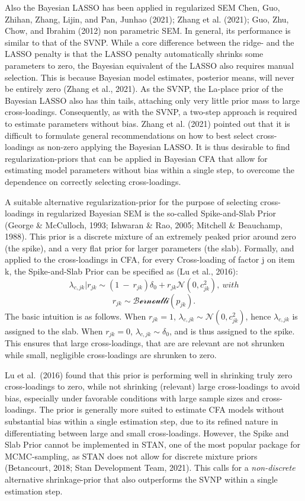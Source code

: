 \documentclass[
  man, donotrepeattitle,floatsintext]{apa6}
\begin{document}
Also the Bayesian LASSO has been applied in regularized SEM Chen, Guo, Zhihan, Zhang, Lijin, and Pan, Junhao (2021); Zhang et al. (2021); Guo, Zhu, Chow, and Ibrahim (2012) non parametric SEM. In general, its performance is similar to that of the SVNP. While a core difference between the ridge- and the LASSO penalty is that the LASSO penalty automatically shrinks some parameters to zero, the Bayesian equivalent of the LASSO also requires manual selection. This is because Bayesian model estimates, posterior means, will never be entirely zero (Zhang et al., 2021). As the SVNP, the La-place prior of the Bayesian LASSO also has thin tails, attaching only very little prior mass to large cross-loadings. Consequently, as with the SVNP, a two-step approach is required to estimate parameters without bias. Zhang et al. (2021) pointed out that it is difficult to formulate general recommendations on how to best select cross-loadings as non-zero applying the Bayesian LASSO. It is thus desirable to find regularization-priors that can be applied in Bayesian CFA that allow for estimating model parameters without bias within a single step, to overcome the dependence on correctly selecting cross-loadings.

A suitable alternative regularization-prior for the purpose of selecting cross-loadings in
regularized Bayesian SEM is the so-called Spike-and-Slab Prior (George \& McCulloch, 1993; Ishwaran \& Rao, 2005; Mitchell \& Beauchamp, 1988). This prior is a discrete mixture of an extremely peaked prior around zero (the spike), and a very flat prior for larger parameters (the slab). Formally, and applied to the cross-loadings in CFA, for every Cross-loading of factor j
on item k, the Spike-and-Slab Prior can be specified as (Lu et al., 2016):
\[\lambda_{c,jk} |r_{jk} \sim (1 \ - \ r_{jk})\delta_0 + r_{jk} \mathcal{N}(0, c^2_{jk}) , \ with\]
\[r_{jk} \sim \mathcal{Bernoulli}(p_{jk}).\]
The basic intuition is as follows. When \(r_{jk} = 1\), \(\lambda_{c,jk} \sim \mathcal{N}(0, c^2_{jk})\), hence \(\lambda_{c,jk}\) is assigned to the slab. When \(r_{jk} = 0\), \(\lambda_{c,jk} \sim \delta_0\), and is thus assigned to the spike. This ensures that large cross-loadings, that are are relevant are not shrunken while small, negligible cross-loadings are shrunken to zero.

Lu et al.~(2016) found that this prior is performing well in shrinking truly zero cross-loadings to zero, while not shrinking (relevant) large cross-loadings to avoid bias, especially under favorable conditions with large sample sizes and cross-loadings. The prior is generally more suited to estimate CFA models without substantial bias within a single estimation step, due to its refined nature in differentiating between large and small cross-loadings. However, the Spike and Slab Prior cannot be implemented in STAN, one of the most popular package for MCMC-sampling, as STAN does not allow for discrete mixture priors (Betancourt, 2018; Stan Development Team, 2021). This calls for a \emph{non-discrete} alternative shrinkage-prior that also outperforms the SVNP within a single estimation step.
\end{document}
